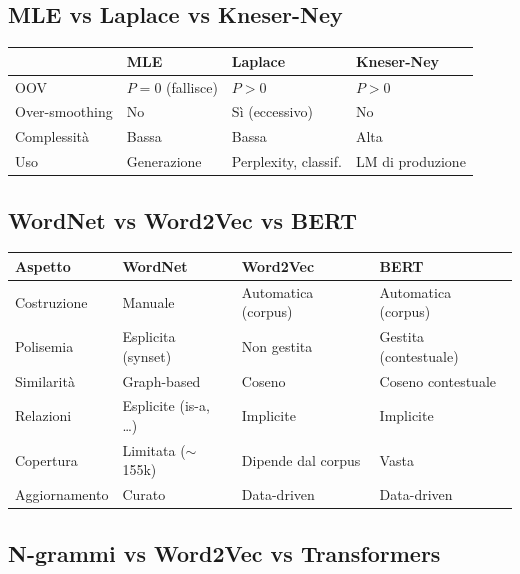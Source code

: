 \documentclass[12pt,a4paper]{article}
\begin{document}
\subsection{MLE vs Laplace vs Kneser-Ney}

\begin{center}
\begin{tabular}{llll}
\toprule
& \textbf{MLE} & \textbf{Laplace} & \textbf{Kneser-Ney} \\
\midrule
OOV & $P=0$ (fallisce) & $P>0$ & $P>0$ \\
Over-smoothing & No & Sì (eccessivo) & No \\
Complessità & Bassa & Bassa & Alta \\
Uso & Generazione & Perplexity, classif. & LM di produzione \\
\bottomrule
\end{tabular}
\end{center}

\subsection{WordNet vs Word2Vec vs BERT}

\begin{center}
\begin{tabular}{llll}
\toprule
\textbf{Aspetto} & \textbf{WordNet} & \textbf{Word2Vec} & \textbf{BERT} \\
\midrule
Costruzione & Manuale & Automatica (corpus) & Automatica (corpus) \\
Polisemia & Esplicita (synset) & Non gestita & Gestita (contestuale) \\
Similarità & Graph-based & Coseno & Coseno contestuale \\
Relazioni & Esplicite (is-a, \ldots) & Implicite & Implicite \\
Copertura & Limitata ($\sim$155k) & Dipende dal corpus & Vasta \\
Aggiornamento & Curato & Data-driven & Data-driven \\
\bottomrule
\end{tabular}
\end{center}

\subsection{N-grammi vs Word2Vec vs Transformers}
\end{document}
